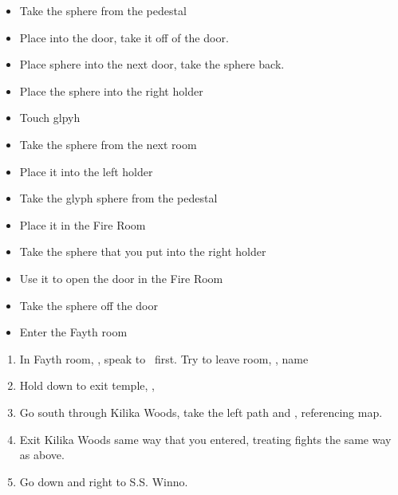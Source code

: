 \begin{trial}
	\begin{itemize}
		\item Take the sphere from the pedestal
		\item Place into the door, take it off of the door.
		\item Place sphere into the next door, take the sphere back.
		\item Place the sphere into the right holder
		\item Touch glpyh
		\item Take the sphere from the next room
		\item Place it into the left holder
		\item Take the glyph sphere from the pedestal
		\item Place it in the Fire Room
		\item Take the sphere that you put into the right holder
		\item Use it to open the door in the Fire Room
		\item Take the sphere off the door
		\item Enter the Fayth room
	\end{itemize}
\end{trial}
\begin{enumerate}[resume]
	\item In Fayth room, \sd, speak to \wakka\ first. Try to leave room, \sd, name \ifrit
	\item Hold down to exit temple, \cs[0:40], \sd
	\item Go south through Kilika Woods, take the left path and , referencing map.
	\item Exit Kilika Woods same way that you entered, treating fights the same way as above.
	\item Go down and right to S.S. Winno. \sd
\end{enumerate}